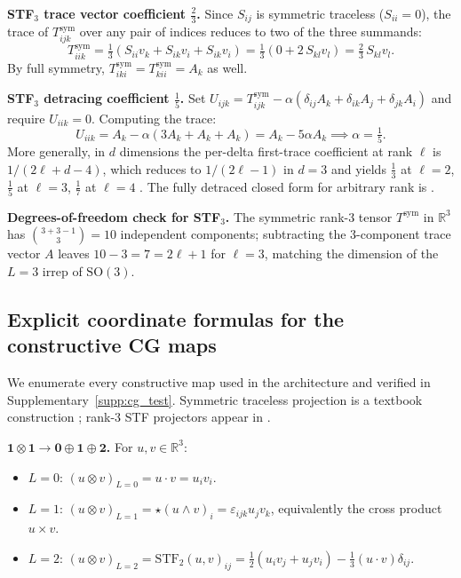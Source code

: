 \textbf{STF$_3$ trace vector coefficient $\tfrac{2}{3}$.} Since $S_{ij}$ is symmetric traceless ($S_{ii}=0$), the trace of $T^{\text{sym}}_{ijk}$ over any pair of indices reduces to two of the three summands:
\[
T^{\text{sym}}_{iik} = \tfrac{1}{3}(S_{ii}v_k + S_{ik}v_i + S_{ik}v_i) = \tfrac{1}{3}(0 + 2\,S_{kl}v_l) = \tfrac{2}{3}\,S_{kl}v_l.
\]
By full symmetry, $T^{\text{sym}}_{iki} = T^{\text{sym}}_{kii} = A_k$ as well.

\textbf{STF$_3$ detracing coefficient $\tfrac{1}{5}$.} Set $U_{ijk} = T^{\text{sym}}_{ijk} - \alpha(\delta_{ij}A_k + \delta_{ik}A_j + \delta_{jk}A_i)$ and require $U_{iik} = 0$. Computing the trace:
\[
U_{iik} = A_k - \alpha(3A_k + A_k + A_k) = A_k - 5\alpha A_k \implies \alpha = \tfrac{1}{5}.
\]
More generally, in $d$ dimensions the per-delta first-trace coefficient at rank $\ell$ is $1/(2\ell + d - 4)$, which reduces to $1/(2\ell - 1)$ in $d=3$ and yields $\tfrac{1}{3}$ at $\ell{=}2$, $\tfrac{1}{5}$ at $\ell{=}3$, $\tfrac{1}{7}$ at $\ell{=}4$ \citep{applequist1989traceless,thorne1980multipole}. The fully detraced closed form for arbitrary rank is \citet[Theorem~2]{applequist1989traceless}.

\textbf{Degrees-of-freedom check for STF$_3$.} The symmetric rank-3 tensor $T^{\text{sym}}$ in $\mathbb{R}^3$ has $\binom{3+3-1}{3} = 10$ independent components; subtracting the 3-component trace vector $A$ leaves $10 - 3 = 7 = 2\ell + 1$ for $\ell = 3$, matching the dimension of the $L{=}3$ irrep of $\mathrm{SO}(3)$.

\subsection{Explicit coordinate formulas for the constructive CG maps}\label{supp:cg_proof}

We enumerate every constructive map used in the architecture and verified in Supplementary~\ref{supp:cg_test}. Symmetric traceless projection is a textbook construction \citep{coope1965irreducible,applequist1989traceless,stone2013theory}; rank-3 STF projectors appear in \citet{thorne1980multipole}.

\textbf{$\mathbf{1} \otimes \mathbf{1} \to \mathbf{0} \oplus \mathbf{1} \oplus \mathbf{2}$.}
For $u, v \in \mathbb{R}^3$:
\begin{itemize}
    \item $L{=}0$: $(u \otimes v)_{L=0} = u \cdot v = u_iv_i$.
    \item $L{=}1$: $(u \otimes v)_{L=1} = \star(u \wedge v)_i = \varepsilon_{ijk}u_jv_k$, equivalently the cross product $u \times v$.
    \item $L{=}2$: $(u \otimes v)_{L=2} = \mathrm{STF}_2(u,v)_{ij} = \tfrac{1}{2}(u_iv_j + u_jv_i) - \tfrac{1}{3}(u\cdot v)\delta_{ij}$.
\end{itemize}


